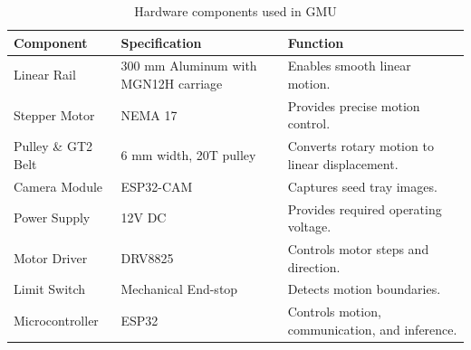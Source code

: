 \documentclass[../main]{subfiles}
\begin{document}
\begin{table}[H]
    \centering
    \begin{tabularx} {\textwidth} {
            >{\raggedright}p{3.5cm}
            >{\raggedright}X
            >{\raggedright\arraybackslash}p{6cm}
        }
        \toprule
        \textbf{Component} & \textbf{Specification} & \textbf{Function} \\ \midrule
        Linear Rail & 300 mm Aluminum with MGN12H carriage & Enables smooth linear motion. \\
        Stepper Motor & NEMA 17 & Provides precise motion control. \\
        Pulley \& GT2 Belt & 6 mm width, 20T pulley & Converts rotary motion to linear displacement. \\
        Camera Module & ESP32-CAM & Captures seed tray images. \\
        Power Supply & 12V DC & Provides required operating voltage. \\
        Motor Driver & DRV8825 & Controls motor steps and direction. \\
        Limit Switch & Mechanical End-stop & Detects motion boundaries. \\
        Microcontroller & ESP32 & Controls motion, communication, and inference. \\
        \bottomrule
    \end{tabularx}
    \caption{Hardware components used in GMU}
\end{table}
\end{document}
